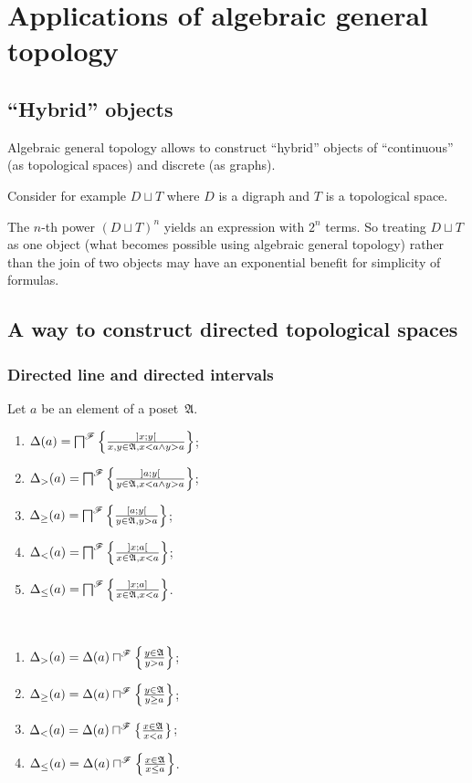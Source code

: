 \chapter{Applications of algebraic general topology}

\section{``Hybrid'' objects}

Algebraic general topology allows to construct ``hybrid'' objects of ``continuous'' (as topological spaces)
and discrete (as graphs).

Consider for example $D\sqcup T$ where $D$ is a digraph and $T$ is a topological space.

The $n$-th power $(D\sqcup T)^n$ yields an expression with $2^n$ terms.
So treating $D\sqcup T$ as one object (what becomes possible using algebraic general topology)
rather than the join of two objects may have an exponential benefit for simplicity of formulas.

\section{A way to construct directed topological spaces}

\subsection{Directed line and directed intervals}

\begin{defn}
Let $a$ be an element of a poset~$\mathfrak{A}$.
\begin{enumerate}
\item $\Delta(a) = \bigsqcap^{\mathscr{F}} \left\{ \frac{]x;y[}{x,y\in\mathfrak{A}, x<a\land y>a}\right\}$;
\item $\Delta_{>}(a) = \bigsqcap^{\mathscr{F}} \left\{ \frac{]a;y[}{y\in\mathfrak{A}, x<a\land y>a}\right\}$;
\item $\Delta_{\geq}(a) = \bigsqcap^{\mathscr{F}} \left\{ \frac{[a;y[}{y\in\mathfrak{A}, y>a}\right\}$;
\item $\Delta_{<}(a) = \bigsqcap^{\mathscr{F}} \left\{ \frac{]x;a[}{x\in\mathfrak{A}, x<a}\right\}$;
\item $\Delta_{\leq}(a) = \bigsqcap^{\mathscr{F}} \left\{ \frac{]x;a]}{x\in\mathfrak{A}, x<a}\right\}$.
\end{enumerate}
\end{defn}

\begin{obvious}
~
\begin{enumerate}
\item $\Delta_{>}(a) = \Delta(a)\sqcap^{\mathscr{F}} \left\{ \frac{y\in\mathfrak{A}}{y>a}\right\}$;
\item $\Delta_{\geq}(a) = \Delta(a)\sqcap^{\mathscr{F}} \left\{ \frac{y\in\mathfrak{A}}{y\geq a}\right\}$;
\item $\Delta_{<}(a) = \Delta(a)\sqcap^{\mathscr{F}} \left\{ \frac{x\in\mathfrak{A}}{x<a}\right\}$;
\item $\Delta_{\leq}(a) = \Delta(a)\sqcap^{\mathscr{F}} \left\{ \frac{x\in\mathfrak{A}}{x\leq a}\right\}$.
\end{enumerate}
\end{obvious}


